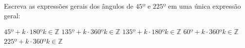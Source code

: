 Escreva as expressões gerais dos ângulos de $45º$ e $225º$ em uma única expressão geral:

$45º+k\cdot 180º$\quad $k\in\mathbb{Z}$
$135º+k\cdot 360º$\quad $k\in\mathbb{Z}$
$135º+k\cdot 180º$\quad $k\in\mathbb{Z}$
$60º+k\cdot 360º$\quad $k\in\mathbb{Z}$
$225º+k\cdot 360º$\quad $k\in\mathbb{Z}$



